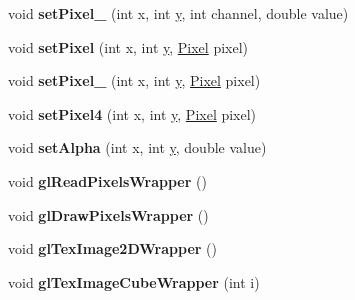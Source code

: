 \begin{DoxyCompactItemize}
\item 
\hypertarget{class_image_a9ad64a83e37335dd21c65dd9b4abea45}{void {\bfseries set\+Pixel\+\_\+} (int x, int \hyperlink{_ice_utils_8h_aa7ffaed69623192258fb8679569ff9ba}{y}, int channel, double value)}\label{class_image_a9ad64a83e37335dd21c65dd9b4abea45}

\item 
\hypertarget{class_image_ad37f9403f799f6343c0d21cc01e150bd}{void {\bfseries set\+Pixel} (int x, int \hyperlink{_ice_utils_8h_aa7ffaed69623192258fb8679569ff9ba}{y}, \hyperlink{class_pixel}{Pixel} pixel)}\label{class_image_ad37f9403f799f6343c0d21cc01e150bd}

\item 
\hypertarget{class_image_adaf0587e994cda89c0575f6b0a4982f3}{void {\bfseries set\+Pixel\+\_\+} (int x, int \hyperlink{_ice_utils_8h_aa7ffaed69623192258fb8679569ff9ba}{y}, \hyperlink{class_pixel}{Pixel} pixel)}\label{class_image_adaf0587e994cda89c0575f6b0a4982f3}

\item 
\hypertarget{class_image_a89d84b69283b6400eea03740daa30b78}{void {\bfseries set\+Pixel4} (int x, int \hyperlink{_ice_utils_8h_aa7ffaed69623192258fb8679569ff9ba}{y}, \hyperlink{class_pixel}{Pixel} pixel)}\label{class_image_a89d84b69283b6400eea03740daa30b78}

\item 
\hypertarget{class_image_ac3f04658d593d5c51c06e05eed5cca52}{void {\bfseries set\+Alpha} (int x, int \hyperlink{_ice_utils_8h_aa7ffaed69623192258fb8679569ff9ba}{y}, double value)}\label{class_image_ac3f04658d593d5c51c06e05eed5cca52}

\item 
\hypertarget{class_image_acf0b0681188e355150cc7c281d635606}{void {\bfseries gl\+Read\+Pixels\+Wrapper} ()}\label{class_image_acf0b0681188e355150cc7c281d635606}

\item 
\hypertarget{class_image_abf1d75c12cbffe7f6bf8d1701a93ffd3}{void {\bfseries gl\+Draw\+Pixels\+Wrapper} ()}\label{class_image_abf1d75c12cbffe7f6bf8d1701a93ffd3}

\item 
\hypertarget{class_image_a809ab8f3c45d5ddcdd8361744ad268a4}{void {\bfseries gl\+Tex\+Image2\+D\+Wrapper} ()}\label{class_image_a809ab8f3c45d5ddcdd8361744ad268a4}

\item 
\hypertarget{class_image_a863f2ddff2371d521264e0d5c7b97bd3}{void {\bfseries gl\+Tex\+Image\+Cube\+Wrapper} (int i)}\label{class_image_a863f2ddff2371d521264e0d5c7b97bd3}


\end{DoxyCompactItemize}
